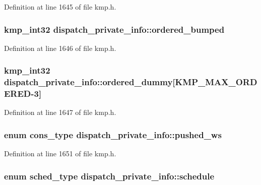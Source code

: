 Definition at line 1645 of file kmp.\-h.

\hypertarget{structdispatch__private__info_a42cf2fd3ce208f4745eac84f8999f7ea}{
\subsubsection[{ordered\-\_\-bumped}]{\setlength{\rightskip}{0pt plus 5cm}kmp\-\_\-int32 dispatch\-\_\-private\-\_\-info\-::ordered\-\_\-bumped}}\label{structdispatch__private__info_a42cf2fd3ce208f4745eac84f8999f7ea}


Definition at line 1646 of file kmp.\-h.

\hypertarget{structdispatch__private__info_aa30ee07b35670f9ebddaa0ea4a952f52}{
\subsubsection[{ordered\-\_\-dummy}]{\setlength{\rightskip}{0pt plus 5cm}kmp\-\_\-int32 dispatch\-\_\-private\-\_\-info\-::ordered\-\_\-dummy\mbox{[}{\bf K\-M\-P\-\_\-\-M\-A\-X\-\_\-\-O\-R\-D\-E\-R\-E\-D}-\/3\mbox{]}}}\label{structdispatch__private__info_aa30ee07b35670f9ebddaa0ea4a952f52}


Definition at line 1647 of file kmp.\-h.

\hypertarget{structdispatch__private__info_a72c2347692c0d4b2cfde90cd309e045a}{
\subsubsection[{pushed\-\_\-ws}]{\setlength{\rightskip}{0pt plus 5cm}enum {\bf cons\-\_\-type} dispatch\-\_\-private\-\_\-info\-::pushed\-\_\-ws}}\label{structdispatch__private__info_a72c2347692c0d4b2cfde90cd309e045a}


Definition at line 1651 of file kmp.\-h.

\hypertarget{structdispatch__private__info_a2144fb89314b5bce245276c9a64c0e59}{
\subsubsection[{schedule}]{\setlength{\rightskip}{0pt plus 5cm}enum {\bf sched\-\_\-type} dispatch\-\_\-private\-\_\-info\-::schedule}}\label{structdispatch__private__info_a2144fb89314b5bce245276c9a64c0e59}


